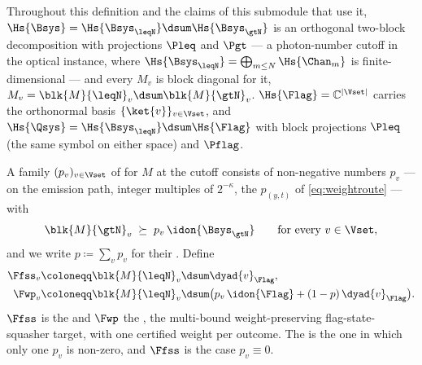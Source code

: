 \begin{definition}
\label{def:targets}
Throughout this definition and the claims of this submodule that use it,
$\Hs{\Bsys}=\Hs{\Bsys_{\leqN}}\dsum\Hs{\Bsys_{\gtN}}$
is an orthogonal two-block decomposition with projections $\Pleq$ and $\Pgt$
--- a photon-number cutoff in the optical instance, where
$\Hs{\Bsys_{\leqN}}=\bigoplus_{m\le N}\Hs{\Chan_m}$ is finite-dimensional ---
and every $M_v$ is block diagonal for it,
$M_v=\blk{M}{\leqN}_v\dsum\blk{M}{\gtN}_v$. $\Hs{\Flag}=\mathbb{C}^{|\Vset|}$
carries the orthonormal basis $\{\ket{v}\}_{v\in\Vset}$, and
$\Hs{\Qsys}=\Hs{\Bsys_{\leqN}}\dsum\Hs{\Flag}$ with block projections
$\Pleq$ (the same symbol on either space) and $\Pflag$.

A family $(p_v)_{v\in\Vset}$ of
for $M$ at the cutoff consists of non-negative numbers $p_v$ --- on the
emission path, integer multiples of $2^{-\kappa}$, the $p_{(y,t)}$ of
\eqref{eq:weightroute} --- with
\begin{equation}\label{eq:certweights}
  \blk{M}{\gtN}_v\;\succeq\;p_v\,\idon{\Bsys_{\gtN}}
  \qquad\text{for every }v\in\Vset ,
\end{equation}
and we write $p\coloneqq\sum_vp_v$ for their
.
Define
\begin{align}
  \Ffss_v&\coloneqq\blk{M}{\leqN}_v\dsum\dyad{v}_{\Flag},
  \label{eq:FSS}\\
  \Fwp_v&\coloneqq\blk{M}{\leqN}_v\dsum
     \big(p_v\,\idon{\Flag}+(1-p)\,\dyad{v}_{\Flag}\big).
  \label{eq:WPFSS}
\end{align}
$\Ffss$ is the
and $\Fwp$ the
,
the multi-bound weight-preserving flag-state-squasher target, with one
certified weight per outcome. The
is the one in which only one $p_v$ is non-zero, and $\Ffss$ is the case
$p_v\equiv0$.
\end{definition}
